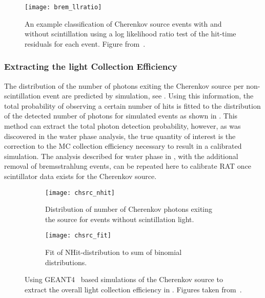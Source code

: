 \begin{figure}
\centering
\texttt{[image: brem\_llratio]}
\caption{\label{fig:brem_llratio} An example classification of Cherenkov source events with and without scintillation using a log likelihood ratio test of the hit-time residuals for each event. Figure from~\cite{Heintzelman:2013}.}
\end{figure}


\subsubsection{Extracting the light Collection Efficiency}
The distribution of the number of photons exiting the Cherenkov source per non-scintillation event are predicted by simulation, see . 
Using this information, the total probability of observing a certain number of hits is fitted to the distribution of the detected number of photons for simulated events as shown in .
This method can extract the total photon detection probability, however, as was discovered in the water phase analysis, the true quantity of interest is the correction to the MC collection efficiency necessary to result in a calibrated simulation.
The analysis described for water phase in , with the additional removal of bremsstrahlung events, can be repeated here to calibrate RAT once scintillator data exists for the Cherenkov source.

\begin{figure}
\begin{subfigure}{.48\textwidth}
\texttt{[image: chsrc\_nhit]}
\caption{Distribution of number of Cherenkov photons exiting the source for events without scintillation light.}
\label{fig:nphotons}
\end{subfigure}
\hspace{0.5cm}
\begin{subfigure}{.48\textwidth}
\texttt{[image: chsrc\_fit]}
\caption{Fit of NHit-distribution to sum of binomial distributions.}
\label{fig:fit}
\end{subfigure}
\caption{Using GEANT4~\cite{geant4} based simulations of the Cherenkov source to extract the overall light collection efficiency in {\snop}. Figures taken from~\cite{Heintzelman:2013}. }
\label{fig:heintzelman-plots}
\end{figure}
 
